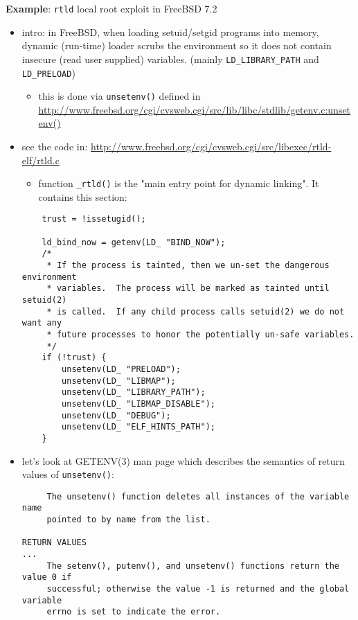 {\bf Example}: \texttt{rtld} local root exploit in FreeBSD 7.2
\begin{itemize}
  \item intro: in FreeBSD, when loading setuid/setgid programs into memory,
                  dynamic (run-time) loader scrubs the environment so it
		  does not contain insecure (read user supplied) variables.
		  (mainly \texttt{LD\_LIBRARY\_PATH} and \texttt{LD\_PRELOAD})
   \begin{itemize}
   \item this is done via \texttt{unsetenv()} defined in
     \url{http://www.freebsd.org/cgi/cvsweb.cgi/src/lib/libc/stdlib/getenv.c:unsetenv()}
   \end{itemize}
  \item see the code in:
        \url{http://www.freebsd.org/cgi/cvsweb.cgi/src/libexec/rtld-elf/rtld.c}
    \begin{itemize}
    \item function \texttt{\_rtld()} is the "main entry point for dynamic
       linking". It contains this section:
    \end{itemize}
\begin{verbatim}
    trust = !issetugid();

    ld_bind_now = getenv(LD_ "BIND_NOW");
    /* 
     * If the process is tainted, then we un-set the dangerous environment
     * variables.  The process will be marked as tainted until setuid(2)
     * is called.  If any child process calls setuid(2) we do not want any
     * future processes to honor the potentially un-safe variables.
     */
    if (!trust) {
        unsetenv(LD_ "PRELOAD");
        unsetenv(LD_ "LIBMAP");
        unsetenv(LD_ "LIBRARY_PATH");
        unsetenv(LD_ "LIBMAP_DISABLE");
        unsetenv(LD_ "DEBUG");
        unsetenv(LD_ "ELF_HINTS_PATH");
    }
\end{verbatim}
  \item let's look at GETENV(3) man page which describes the semantics of
    return values of \texttt{unsetenv()}:
\begin{verbatim}
     The unsetenv() function deletes all instances of the variable name
     pointed to by name from the list.

RETURN VALUES
...
     The setenv(), putenv(), and unsetenv() functions return the value 0 if
     successful; otherwise the value -1 is returned and the global variable
     errno is set to indicate the error.


\end{verbatim}
\end{itemize}
